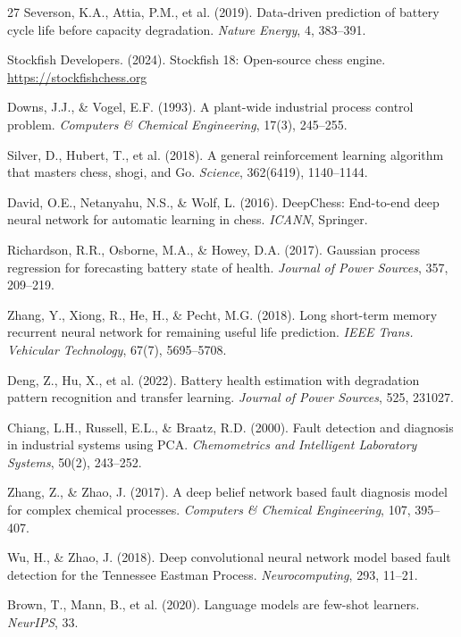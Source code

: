 \documentclass[12pt,a4paper]{article}
\begin{document}
\begin{thebibliography}{27}
Severson, K.A., Attia, P.M., et al. (2019). Data-driven prediction of battery cycle life before
capacity degradation. \emph{Nature Energy}, 4, 383--391.

Stockfish Developers. (2024). Stockfish 18: Open-source chess engine. \url{https://stockfishchess.org}

Downs, J.J., \& Vogel, E.F. (1993). A plant-wide industrial process control problem.
\emph{Computers \& Chemical Engineering}, 17(3), 245--255.

Silver, D., Hubert, T., et al. (2018). A general reinforcement learning algorithm that masters
chess, shogi, and Go. \emph{Science}, 362(6419), 1140--1144.

David, O.E., Netanyahu, N.S., \& Wolf, L. (2016). DeepChess: End-to-end deep neural network for
automatic learning in chess. \emph{ICANN}, Springer.

Richardson, R.R., Osborne, M.A., \& Howey, D.A. (2017). Gaussian process regression for
forecasting battery state of health. \emph{Journal of Power Sources}, 357, 209--219.

Zhang, Y., Xiong, R., He, H., \& Pecht, M.G. (2018). Long short-term memory recurrent neural
network for remaining useful life prediction. \emph{IEEE Trans. Vehicular Technology}, 67(7), 5695--5708.

Deng, Z., Hu, X., et al. (2022). Battery health estimation with degradation pattern recognition
and transfer learning. \emph{Journal of Power Sources}, 525, 231027.

Chiang, L.H., Russell, E.L., \& Braatz, R.D. (2000). Fault detection and diagnosis in industrial
systems using PCA. \emph{Chemometrics and Intelligent Laboratory Systems}, 50(2), 243--252.

Zhang, Z., \& Zhao, J. (2017). A deep belief network based fault diagnosis model for complex
chemical processes. \emph{Computers \& Chemical Engineering}, 107, 395--407.

Wu, H., \& Zhao, J. (2018). Deep convolutional neural network model based fault detection for the
Tennessee Eastman Process. \emph{Neurocomputing}, 293, 11--21.

Brown, T., Mann, B., et al. (2020). Language models are few-shot learners. \emph{NeurIPS}, 33.


\end{thebibliography}
\end{document}
